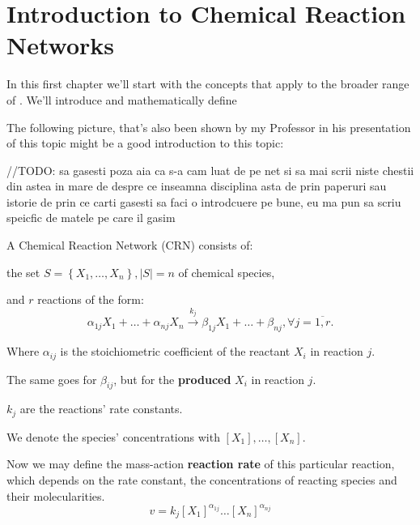 \chapter{Introduction to Chemical Reaction Networks}\label{chap:ch1}

In this first chapter we'll start with the concepts that apply to the broader range of . We'll introduce and mathematically define

The following picture, that's also been shown by my Professor in his presentation of this topic might be a good introduction to this topic:

\hfill\break
//TODO: sa gasesti poza aia ca s-a cam luat de pe net
si sa mai scrii niste chestii din astea in mare de despre ce inseamna disciplina asta de prin paperuri sau istorie de prin ce carti gasesti sa faci o introdcuere pe bune, eu ma pun sa scriu speicfic de matele pe care il gasim
\hfill\break

A Chemical Reaction Network (CRN) consists of:

the set $S = \left\{ X_1, \dots, X_n \right\}, \left| S \right| = n$ of chemical species,

and $r$ reactions of the form:
\begin{equation}\label{mass-action_network}
	\alpha_{1j} X_1 + \dots + \alpha_{n j} X_n \xrightarrow{k_j} \beta_{1j} X_1 + \dots + \beta_{n j}, \forall j = \overline{1,r}.	
\end{equation}

Where $\alpha_{ij}$ is the stoichiometric coefficient of the reactant $X_i$ in reaction $j$.

The same goes for $\beta_{ij}$, but for the \textbf{produced} $X_i$ in reaction $j$.

$k_j$ are the reactions' rate constants.

We denote the species' concentrations with $[X_1], \dots, [X_n]$.

Now we may define the mass-action \textbf{reaction rate} of this particular reaction, which depends on the rate constant, the concentrations of reacting species and their molecularities.
\begin{equation}\label{reaction_rate}
	v = k_j [X_1]^{\alpha_{1j}} \dots [X_n]^{\alpha_{nj}}
\end{equation}

